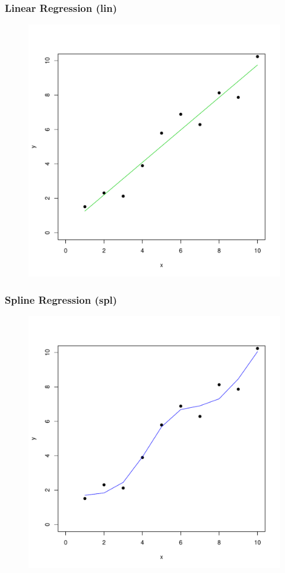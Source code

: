 \documentclass[xcolor=x11names,compress]{beamer}\usepackage[]{graphicx}\usepackage[]{color}
\newenvironment{knitrout}{}{} %
\begin{document}
\begin{frame}[plain]
  \frametitle{Linear Regression (lin)}
\begin{figure}
\centering
\begin{knitrout}\tiny
{}\color{fgcolor}

{\centering \includegraphics[width=.6\linewidth]{figure/beamer-unnamed-chunk-41-1} 

}



\end{knitrout}
\end{figure}
\end{frame}

\begin{frame}[plain]
  \frametitle{Spline Regression (spl)}
\begin{figure}
\centering
\begin{knitrout}\tiny
{}\color{fgcolor}

{\centering \includegraphics[width=.6\linewidth]{figure/beamer-unnamed-chunk-42-1} 

}



\end{knitrout}
\end{figure}
\end{frame}
\end{document}
